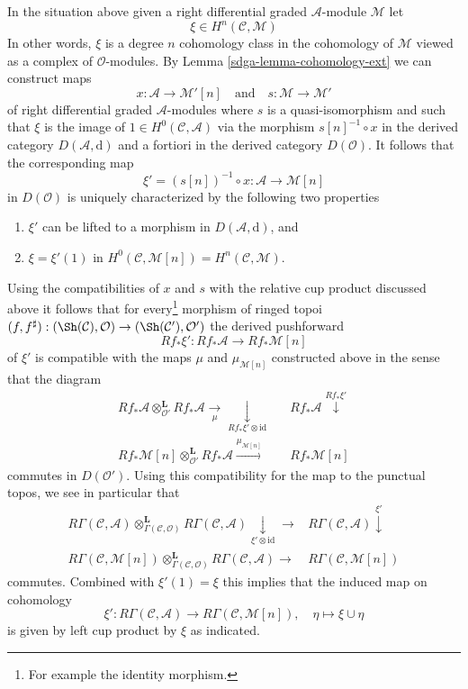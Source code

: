 \medskip\noindent
In the situation above given a right differential graded $\mathcal{A}$-module
$\mathcal{M}$ let
$$
\xi \in H^n(\mathcal{C}, \mathcal{M})
$$
In other words, $\xi$ is a degree $n$ cohomology class in the cohomology
of $\mathcal{M}$ viewed as a complex of $\mathcal{O}$-modules. By
Lemma \ref{sdga-lemma-cohomology-ext} we can construct maps
$$
x : \mathcal{A} \rightarrow \mathcal{M}'[n]
\quad\text{and}\quad
s : \mathcal{M} \to \mathcal{M}'
$$
of right differential graded $\mathcal{A}$-modules where $s$ is a
quasi-isomorphism and such that $\xi$ is the image of
$1 \in H^0(\mathcal{C}, \mathcal{A})$ via the morphism
$s[n]^{-1} \circ x$ in the derived category
$D(\mathcal{A}, \text{d})$ and a fortiori in the derived
category $D(\mathcal{O})$. It follows that the corresponding map
$$
\xi' = (s[n])^{-1} \circ x : \mathcal{A} \longrightarrow \mathcal{M}[n]
$$
in $D(\mathcal{O})$ is uniquely characterized by the following
two properties
\begin{enumerate}
\item $\xi'$ can be lifted to a morphism in $D(\mathcal{A}, \text{d})$, and
\item $\xi = \xi'(1)$ in
$H^0(\mathcal{C}, \mathcal{M}[n]) = H^n(\mathcal{C}, \mathcal{M})$.
\end{enumerate}
Using the compatibilities of $x$ and $s$ with the relative cup product
discussed above it follows that for every\footnote{For example
the identity morphism.} morphism of ringed topoi
$(f, f^\sharp) : (\Sh(\mathcal{C}), \mathcal{O})
\to (\Sh(\mathcal{C}'), \mathcal{O}')$ the derived pushforward
$$
Rf_*\xi' : Rf_*\mathcal{A}  \longrightarrow Rf_*\mathcal{M}[n]
$$
of $\xi'$ is compatible with the maps $\mu$ and $\mu_{\mathcal{M}[n]}$
constructed above in the sense that the diagram
$$
\begin{array}{ccc}Rf_*\mathcal{A} \otimes_{\mathcal{O}'}^\mathbf{L} Rf_*\mathcal{A}
\underset{\mu}{\longrightarrow}\underset{Rf_*\xi' \otimes \text{id}}{\downarrow} &  & Rf_*\mathcal{A} \overset{Rf_*\xi'}{\downarrow} \\ Rf_*\mathcal{M}[n] \otimes_{\mathcal{O}'}^\mathbf{L} Rf_*\mathcal{A}
\overset{\mu_{\mathcal{M}[n]}}{\longrightarrow} &  & Rf_*\mathcal{M}[n]\end{array}
$$
commutes in $D(\mathcal{O}')$. Using this compatibility for the
map to the punctual topos, we see in particular that
$$
\begin{array}{cc}R\Gamma(\mathcal{C}, \mathcal{A})
\otimes_{\Gamma(\mathcal{C}, \mathcal{O})}^\mathbf{L}
R\Gamma(\mathcal{C}, \mathcal{A})
\underset{\xi' \otimes \text{id}}{\downarrow}\longrightarrow & R\Gamma(\mathcal{C}, \mathcal{A}) \overset{\xi'}{\downarrow} \\ R\Gamma(\mathcal{C}, \mathcal{M}[n])
\otimes_{\Gamma(\mathcal{C}, \mathcal{O})}^\mathbf{L}
R\Gamma(\mathcal{C}, \mathcal{A})
\longrightarrow & R\Gamma(\mathcal{C}, \mathcal{M}[n])\end{array}
$$
commutes. Combined with $\xi'(1) = \xi$ this implies that
the induced map on cohomology
$$
\xi' : R\Gamma(\mathcal{C}, \mathcal{A}) \to
R\Gamma(\mathcal{C}, \mathcal{M}[n]), \quad \eta \mapsto \xi \cup \eta
$$
is given by left cup product by $\xi$ as indicated.

